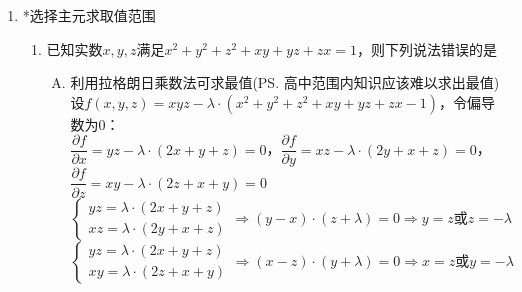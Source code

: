 \begin{enumerate}
\begin{enumerate}
\begin{jieda}
\begin{enumerate}
                其判别式为$\Delta = -3(a+1)^2$，故仅当$a = -1$时有解$a+b = -2$，故$M = \{-2, 1\}$
            \end{enumerate}
        \end{jieda}
    \end{enumerate}
    \item *选择主元求取值范围
    \begin{enumerate}
        \item 已知实数$x, y, z$满足$x^2+y^2+z^2+xy+yz+zx = 1$，则下列说法错误的是
        \begin{jieda}
            \begin{enumerate}[A.]
                \item 利用拉格朗日乘数法可求最值(\ps 高中范围内知识应该难以求出最值) \\
                设$f(x,y,z) = xyz - \lambda \cdot (x^2+y^2+z^2+xy+yz+zx - 1)$，令偏导数为0： \\
                $\dfrac{\partial f}{\partial x} = yz - \lambda \cdot (2x+y+z) = 0$，$\dfrac{\partial f}{\partial y} = xz - \lambda \cdot (2y+x+z) = 0$，$\dfrac{\partial f}{\partial z} = xy - \lambda \cdot (2z+x+y) = 0$ \\
                $\left \{ \begin{array}{l}
                     yz = \lambda \cdot (2x+y+z)  \\
                     xz = \lambda \cdot (2y+x+z)
                \end{array}\right . \Longrightarrow (y-x)\cdot(z+\lambda) = 0 \Longrightarrow y = z \mbox{或} z = -\lambda$ \\
                $\left \{ \begin{array}{l}
                     yz = \lambda \cdot (2x+y+z)  \\
                     xy = \lambda \cdot (2z+x+y)
                \end{array}\right . \Longrightarrow (x-z)\cdot(y+\lambda) = 0\Longrightarrow x = z \mbox{或} y = -\lambda$
\end{enumerate}
\end{jieda}
\end{enumerate}
\end{enumerate}
